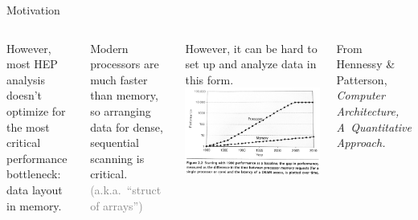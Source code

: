 \documentclass[aspectratio=169]{beamer}
\begin{document}
\begin{frame}{Motivation}
\begin{columns}
However, most HEP analysis doesn't optimize for the most critical performance bottleneck: data layout in memory.

\vspace{0.5 cm}
Modern processors are much faster than memory, so arranging data for dense, sequential scanning is critical. \textcolor{gray}{(a.k.a.\ ``struct of arrays'')}

\vspace{0.5 cm}
However, it can be hard to set up and analyze data in this form.
\vspace{0.3 cm}
\includegraphics[width=\linewidth]{performance-gap.jpg}

\vspace{0.25 cm}
\begin{columns}
\tiny
From Hennessy \& Patterson, {\it Computer Architecture, A~Quantitative Approach.}


\end{columns}
\end{columns}
\end{frame}
\end{document}
